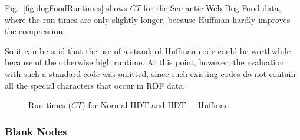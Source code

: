 Fig.~\ref{fig:dogFoodRuntimes} shows $CT$ for the Semantic Web Dog Food data, where the run times are only slightly longer, because Huffman hardly improves the compression.

So it can be said that the use of a standard Huffman code could be worthwhile because of the otherwise high runtime. At this point, however, the evaluation with such a standard code was omitted, since such existing codes do not contain all the special characters that occur in RDF data.


\begin{figure}[h]
	\centering
	\hfill
	\caption{Run times ($CT$) for Normal HDT and HDT + Huffman.}
	\label{fig:huffmanRuntimes}
\end{figure}

\subsubsection{Blank Nodes}

